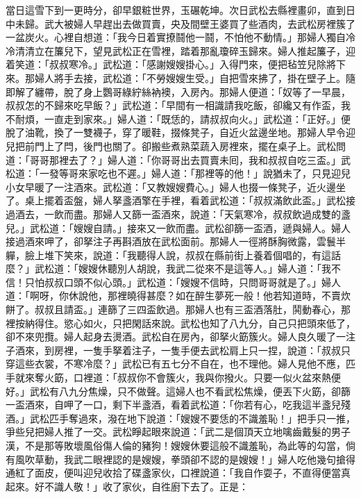 當日這雪下到一更時分，卻早銀粧世界，玉碾乾坤。次日武松去縣裡畫卯，直到日中未歸。武大被婦人早趕出去做買賣，央及間壁王婆買了些酒肉，{}去武松房裡簇了一盆炭火。心裡自想道：「我今日着實撩鬪他一鬪，不怕他不動情。」那婦人獨自冷冷清清立在簾兒下，望見武松正在雪裡，踏着那亂瓊碎玉歸來。婦人推起簾子，迎着笑道：「叔叔寒冷。」武松道：「感謝嫂嫂掛心。」入得門來，便把毡笠兒除將下來。那婦人將手去接，武松道：「不勞嫂嫂生受。」自把雪來拂了，{}掛在壁子上。隨即解了纏帶，脫了身上鸚哥綠紵絲衲襖，入房內。那婦人便道：「奴等了一早晨，叔叔怎的不歸來吃早飯？」武松道：「早間有一相識請我吃飯，卻纔又有作盃，我不耐煩，一直走到家來。」婦人道：「既恁的，請叔叔向火。」武松道：「正好。」便脫了油靴，換了一雙襪子，穿了暖鞋，掇條凳子，自近火盆邊坐地。{}那婦人早令迎兒把前門上了閂，後門也關了。卻搬些煮熟菜蔬入房裡來，擺在桌子上。武松問道：「哥哥那裡去了？」婦人道：「你哥哥出去買賣未囘，我和叔叔自吃三盃。」武松道：「一發等哥來家吃也不遲。」婦人道：「那裡等的他！」說猶未了，只見迎兒小女早暖了一注酒來。武松道：「又教嫂嫂費心。」婦人也掇一條凳子，近火邊坐了。桌上擺着盃盤，婦人拏盞酒擎在手裡，看着武松道：「叔叔滿飲此盃。」武松接過酒去，一飲而盡。那婦人又篩一盃酒來，說道：「天氣寒冷，叔叔飲過成雙的盞兒。」{}武松道：「嫂嫂自請。」接來又一飲而盡。武松卻篩一盃酒，遞與婦人。婦人接過酒來呷了，卻拏注子再斟酒放在武松面前。那婦人一徑將酥胸微露，雲鬟半軃，{}臉上堆下笑來，說道：「我聽得人說，叔叔在縣前街上養着個唱的，有這話麼？」{}武松道：「嫂嫂休聽別人胡說，我武二從來不是這等人。」{}婦人道：「我不信！只怕叔叔口頭不似心頭。」武松道：「嫂嫂不信時，只問哥哥就是了。」婦人道：「啊呀，你休說他，那裡曉得甚麼？{}如在醉生夢死一般！{}他若知道時，不賣炊餅了。叔叔且請盃。」連篩了三四盃飲過。那婦人也有三盃酒落肚，鬨動春心，那裡按納得住。慾心如火，只把閑話來說。武松也知了八九分，自己只把頭來低了，卻不來兜攬。婦人起身去燙酒。武松自在房內，卻拏火筯簇火。{}婦人良久暖了一注子酒來，到房裡，一隻手拏着注子，一隻手便去武松肩上只一捏，說道：「叔叔只穿這些衣裳，不寒冷麼？」武松已有五七分不自在，也不理他。{}婦人見他不應，匹手就來奪火筯，口裡道：「叔叔你不會簇火，我與你撥火。只要一似火盆來熱便好。」武松有八九分焦燥，只不做聲。這婦人也不看武松焦燥，{}便丟下火筯，卻篩一盃酒來，自呷了一口，剩下半盞酒，看着武松道：「你若有心，吃我這半盞兒殘酒。」武松匹手奪過來，{}潑在地下說道：「嫂嫂不要恁的不識羞恥！」{}把手只一推，爭些兒把婦人推了一交。{}武松睜起眼來說道：「武二是個頂天立地噙齒戴髮的男子漢，不是那等敗壞風俗傷人倫的豬狗！{}嫂嫂休要這般不識羞恥，為此等的勾當，倘有風吹草動，我武二眼裡認的是嫂嫂，拳頭卻不認的是嫂嫂！」{}婦人吃他幾句搶得通紅了面皮，便叫迎兒收拾了碟盞家伙，{}口裡說道：「我自作耍子，不直得便當真起來。好不識人敬！」{}收了家伙，自徃廚下去了。正是：

